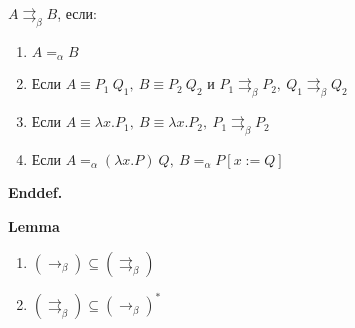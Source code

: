 \documentclass[12pt]{extreport}
\begin{document}
    $A \rightrightarrows_\beta B$, если:
    \begin{enumerate}[leftmargin=2cm]
        \item $A =_\alpha B$
        \item Если $A \equiv P_1\ Q_1,\ B \equiv P_2\ Q_2$ и $P_1 \rightrightarrows_\beta P_2,\ Q_1 \rightrightarrows_\beta Q_2$
        \item Если $A \equiv \lambda x. P_1,\ B \equiv \lambda x.P_2,\ P_1 \rightrightarrows_\beta P_2$
        \item Если $A =_\alpha (\lambda x. P)\ Q,\ B =_\alpha P[x := Q]$
    \end{enumerate}    
    
\noindent\textbf{Enddef.}
\vspace{5mm}   

\noindent\textbf{Lemma}
    
    \begin{enumerate}
        \item $(\rightarrow_\beta) \subseteq (\rightrightarrows_\beta)$ 
        \item$(\rightrightarrows_\beta) \subseteq (\rightarrow_\beta)^* $ 
    \end{enumerate}
     
\end{document}
